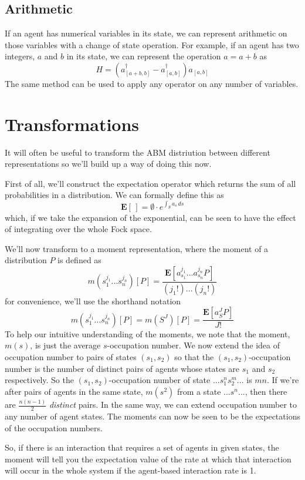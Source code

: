 \documentclass[letterpaper,twocolumn,10pt]{article}
\begin{document}
\subsection{Arithmetic}

If an agent has numerical variables in its state, we can represent arithmetic on those variables with a change of state operation. For example, if an agent has two integers, $a$ and $b$ in its state, we can represent the operation $a = a + b$ as
\[
H = (a^\dag_{[a+b,b]} - a_{[a,b]}^\dag)a_{[a,b]}
\]
The same method can be used to apply any operator on any number of variables.

\section{Transformations}

It will often be useful to transform the ABM distriution between different representations so we'll build up a way of doing this now.

First of all, we'll construct the expectation operator which returns the sum of all probabilities in a distribution. We can formally define this as
\[
\mathbf{E}[\, ] = \emptyset \cdot e^{\int_S a_s \, ds}
\]
which, if we take the expansion of the exponential, can be seen to have the effect of integrating over the whole Fock space.

We'll now transform to a moment representation, where the moment of a distribution $P$ is defined as
\[
m(s_1^{j_1}...s_n^{j_n})[P] = \frac{\mathbf{E}[a_{s_1}^{j_1}...a_{s_n}^{j_n}P]}{(j_1!)...(j_n!)} 
\]
for convenience, we'll use the shorthand notation
\[
m(s_1^{j_1}...s_n^{j_n})[P] = m(S^J)[P] = \frac{\mathbf{E}[a_S^JP]}{J!}
\]
To help our intuitive understanding of the moments, we note that the moment, $m(s)$, is just the average $s$-occupation number. We now extend the idea of occupation number to pairs of states $(s_1,s_2)$ so that the $(s_1,s_2)$-occupation number is the number of distinct pairs of agents whose states are $s_1$ and $s_2$ respectively. So the $(s_1,s_2)$-occupation number of state $...s_1^ns_2^m...$ is $mn$. If we're after pairs of agents in the same state, $m(s^2)$ from a state $...s^n...$, then there are $\frac{n(n-1)}{2}$ \textit{distinct} pairs. In the same way, we can extend occupation number to any number of agent states. The moments can now be seen to be the expectations of the occupation numbers.

So, if there is an interaction that requires a set of agents in given states, the moment will tell you the expectation value of the rate at which that interaction will occur in the whole system if the agent-based interaction rate is 1.
\end{document}

